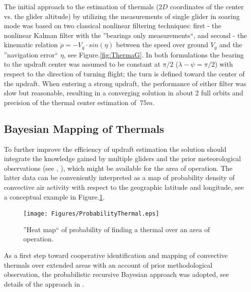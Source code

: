 \documentclass{ifacconf}
\newcommand{\squeezeup}{\vspace{-2.0mm}}
\begin{document}
The initial approach to the estimation of thermals ($2D$ coordinates of the
center vs. the glider altitude) by utilizing the measurements of single
glider in soaring mode was based on two classical nonlinear filtering
techniques: first - the nonlinear Kalman filter with the ''bearings only
measurements``, and second - the kinematic relation $\dot{\rho}=-V_g\cdot
sin(\eta)$ between the speed over ground $V_g$ and the ''navigation error``
$\eta$, see Figure.\ref{fig:ThermaG}. In both formulations the bearing to the
updraft center was assumed to be constant at $\pi/2$ ($\lambda-\psi=\pi/2$)
with respect to the direction of turning flight; the turn is defined toward
the center of the updraft. When entering a strong updraft, the performance of
either filter was slow but reasonable, resulting in a converging solution in
about 2 full orbits and precision of the thermal center estimation of $~75m$.
%

\subsection{Bayesian Mapping of Thermals}
\label{subsec:BayesianMapping}
\squeezeup

To further improve the efficiency of updraft estimation the solution should
integrate the knowledge gained by multiple gliders and the prior
meteorological observations (see \cite{Pennycuick:1998},
\cite{Hindman:2007}), which might be available for the area of operation. The
latter data can be conveniently interpreted as a map of probability density
of convective air activity with respect to the geographic latitude and
longitude, see a conceptual example in Figure.\ref{fig:HeatMap}.
\begin{figure}[thpb]
  \centering
  \texttt{[image: Figures/ProbabilityThermal.eps]}
  \caption{''Heat map`` of probability of finding a thermal over an area of operation.}
  \label{fig:HeatMap}
\end{figure}
As a first step toward cooperative identification and mapping of convective
thermals over extended areas with an account of prior methodological
observation, the probabilistic recursive Bayesian approach was adopted, see
details of the approach in \cite{Bergman:1999}.
\end{document}
